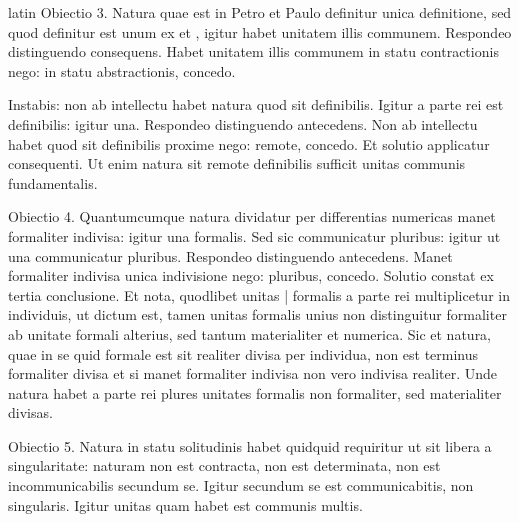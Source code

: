 \begin{otherlanguage*}{latin}
\pstart
 Obiectio 3. Natura quae est in Petro et Paulo definitur unica definitione, sed quod definitur est unum ex  et , igitur habet unitatem illis communem. Respondeo distinguendo consequens. Habet unitatem illis communem in statu contractionis nego: in statu abstractionis, concedo. 
\pend

\pstart
 Instabis: non ab intellectu habet natura quod sit definibilis. Igitur a parte rei est definibilis: igitur una. Respondeo distinguendo antecedens. Non ab intellectu habet quod sit definibilis proxime nego: remote, concedo. Et solutio applicatur consequenti. Ut enim natura sit remote definibilis sufficit unitas communis fundamentalis. 
\pend

\pstart
 Obiectio 4. Quantumcumque natura dividatur per differentias numericas manet formaliter indivisa: igitur una formalis. Sed sic communicatur pluribus: igitur ut una communicatur pluribus. Respondeo distinguendo antecedens. Manet formaliter indivisa unica indivisione nego: pluribus, concedo. Solutio constat ex tertia conclusione. Et nota, quodlibet unitas \textnormal{|} formalis a parte rei multiplicetur in individuis, ut dictum est, tamen unitas formalis unius non distinguitur formaliter ab unitate formali alterius, sed tantum materialiter et numerica. Sic et natura, quae in se quid formale est sit realiter divisa per individua, non est terminus formaliter divisa et si manet formaliter indivisa non vero indivisa realiter. Unde natura habet a parte rei plures unitates formalis non formaliter, sed materialiter divisas. 
\pend

\pstart
 Obiectio 5. Natura in statu solitudinis habet quidquid requiritur ut sit libera a singularitate: naturam non est contracta, non est determinata, non est incommunicabilis secundum se. Igitur secundum se est communicabitis, non singularis. Igitur unitas quam habet est communis multis. 
\pend


\end{otherlanguage*}
